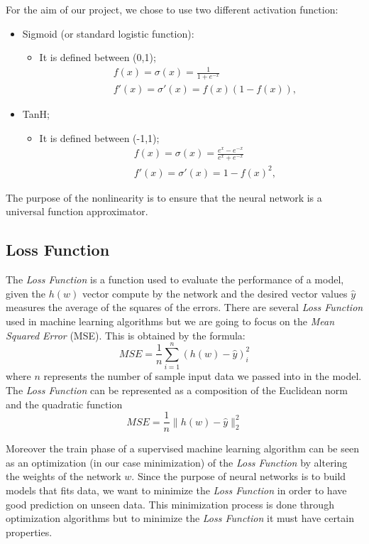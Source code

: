 For the aim of our project, we chose to use two different activation function:
\begin{itemize}
	\label{sigmoid}
	\item Sigmoid (or standard logistic function):
	\begin{itemize}
		\item It is defined between (0,1); 		
			\begin{align*}
			&f(x) = \sigma(x) = \frac{1}{1 + e^{-x}} \\
			&f'(x) = \sigma'(x) = f(x)(1 - f(x)),
			\end{align*} 
	\end{itemize}
	\item TanH;
	\label{tanH}
	\begin{itemize}
		\item It is defined between (-1,1); 		
		\begin{align*}
		&f(x) = \sigma(x) = \frac{e^{x}-e^{-x}}{e^{x} + e^{-x}} \\
		&f'(x) = \sigma'(x) = 1 - f(x)^{2},
		\end{align*} 
	\end{itemize}
\end{itemize}
The purpose of the nonlinearity is to ensure that the neural network is a universal function approximator.
\subsection{Loss Function}
\label{Loss:Mse}
The \textit{Loss Function} is a function used to evaluate the performance of a model, given the $h(w)$ vector compute by the network and the desired vector values $\widehat{y}$ measures the average of the squares of the errors. There are several \textit{Loss Function} used in machine learning algorithms but we are going to focus on the \textit{Mean Squared Error} (MSE). This is obtained by the formula: 	
\begin{equation}
MSE = \frac{1}{n} \sum_{i=1}^n (h(w) - \widehat{y})_{i}^2
\end{equation}
where $n$ represents the number of sample input data we passed into in the model. 
The \textit{Loss Function} can be represented as a composition of the Euclidean norm and the quadratic function
\begin{equation}
MSE = \frac{1}{n} \parallel h(w) - \widehat{y} \parallel_{2}^2  
\end{equation}

Moreover the train phase of a supervised machine learning algorithm can be seen as an optimization (in our case minimization) of the \textit{Loss Function} by altering the weights of the network $w$.   
Since the purpose of neural networks is to build models that fits data, we want to minimize the \textit{Loss Function} in order to have good prediction on unseen data. This minimization process is done through optimization algorithms but to minimize the \textit{Loss Function} it must have certain properties.	

